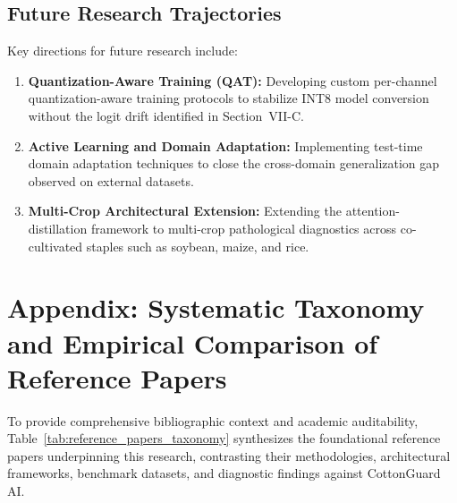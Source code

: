 \documentclass[journal,10pt,twocolumn]{IEEEtran}
\begin{document}
\subsection{Future Research Trajectories}
Key directions for future research include:
\begin{enumerate}[leftmargin=*]
    \item \textbf{Quantization-Aware Training (QAT):} Developing custom per-channel quantization-aware training protocols to stabilize INT8 model conversion without the logit drift identified in Section~VII-C.
    \item \textbf{Active Learning and Domain Adaptation:} Implementing test-time domain adaptation techniques to close the cross-domain generalization gap observed on external datasets.
    \item \textbf{Multi-Crop Architectural Extension:} Extending the attention-distillation framework to multi-crop pathological diagnostics across co-cultivated staples such as soybean, maize, and rice.
\end{enumerate}

\section*{Appendix: Systematic Taxonomy and Empirical Comparison of Reference Papers}
To provide comprehensive bibliographic context and academic auditability, Table~\ref{tab:reference_papers_taxonomy} synthesizes the foundational reference papers underpinning this research, contrasting their methodologies, architectural frameworks, benchmark datasets, and diagnostic findings against CottonGuard AI.
\end{document}
